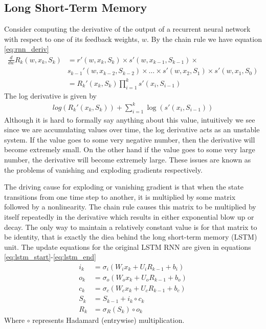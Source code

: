 \subsection{Long Short-Term Memory}
Consider computing the derivative of the output of a recurrent neural network with respect to one of its feedback weights, $w$.  By the chain rule we have equation \ref{eq:rnn_deriv}
\begin{align}\label{eq:rnn_deriv}
\frac{d}{dw}R_k(w,x_k,S_k) &= r'(w,x_k,S_k)\times s'(w,x_{k-1},S_{k-1})\times \nonumber
\\&s_{k-1}'(w,x_{k-2},S_{k-2})\times \dots
\times s'(w,x_2,S_1)\times s'(w,x_1,S_0)\\
&= R_k'(x_k,S_k)\prod_{i=1}^k s'(x_i,S_{i-1})
\end{align}
The log derivative is given by
\begin{align}
log(R_k'(x_k,S_k)) + \sum_{i=1}^k \log(s'(x_i,S_{i-1}))
\end{align}
Although it is hard to formally say anything about this value, intuitively we see since we are accumulating values over time, the log derivative acts as an unstable system.  If the value goes to some very negative number, then the derivative will become extremely small.  On the other hand if the value goes to some very large number, the derivative will become extremely large.  These issues are known as the problems of vanishing and exploding gradients respectively.

The driving cause for exploding or vanishing gradient is that when the state transitions from one time step to another, it is multiplied by some matrix followed by a nonlinearity.  The chain rule causes this matrix to be multiplied by itself repeatedly in the derivative which results in either exponential blow up or decay.  The only way to maintain a relatively constant value is for that matrix to be identity, that is exactly the diea behind the long short-term memory (LSTM) unit. \cite{sh97} The update equations for the original LSTM RNN are given in equations \ref{eq:lstm_start}-\ref{eq:lstm_end}
\begin{align}\label{eq:lstm_start}
i_k &= \sigma_i(W_ix_k + U_iR_{k-1} + b_i)\\
o_k &= \sigma_o(W_ox_k + U_oR_{k-1} + b_o)\\
c_k &= \sigma_c(W_cx_k + U_cR_{k-1} + b_c)\\
S_k &= S_{k-1} + i_k \circ c_k\\
R_k &= \sigma_R(S_k) \circ o_k\label{eq:lstm_end}
\end{align}
Where $\circ$ represents Hadamard (entrywise) multiplication.

